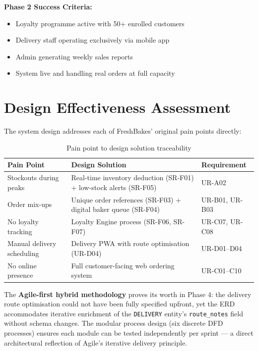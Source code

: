 \documentclass[12pt, a4paper]{report}
\begin{document}
\textbf{Phase 2 Success Criteria:}
\begin{itemize}[noitemsep]
  \item Loyalty programme active with 50+ enrolled customers \checkmark
  \item Delivery staff operating exclusively via mobile app \checkmark
  \item Admin generating weekly sales reports \checkmark
  \item System live and handling real orders at full capacity \checkmark
\end{itemize}

\section{Design Effectiveness Assessment}

The system design addresses each of FreshBakes' original pain points directly:

\begin{table}[H]
  \centering
  \begin{tabularx}{\textwidth}{L{3.5cm} L{5cm} L{3.5cm}}
    \toprule
    \textbf{Pain Point} & \textbf{Design Solution} & \textbf{Requirement} \\
    \midrule
    Stockouts during peaks     & Real-time inventory deduction (SR-F01) + low-stock alerts (SR-F05) & UR-A02 \\
    Order mix-ups              & Unique order references (SR-F03) + digital baker queue (SR-F04)    & UR-B01, UR-B03 \\
    No loyalty tracking        & Loyalty Engine process (SR-F06, SR-F07)                           & UR-C07, UR-C08 \\
    Manual delivery scheduling & Delivery PWA with route optimisation (UR-D04)                     & UR-D01--D04 \\
    No online presence         & Full customer-facing web ordering system                           & UR-C01--C10 \\
    \bottomrule
  \end{tabularx}
  \caption{Pain point to design solution traceability}
\end{table}

The \textbf{Agile-first hybrid methodology} proves its worth in Phase 4: the
delivery route optimisation could not have been fully specified upfront, yet
the ERD accommodates iterative enrichment of the \texttt{DELIVERY} entity's
\texttt{route\_notes} field without schema changes. The modular process design
(six discrete DFD processes) ensures each module can be tested independently
per sprint --- a direct architectural reflection of Agile's iterative delivery
principle.
\end{document}
